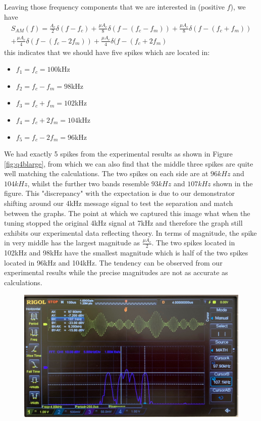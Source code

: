 \documentclass[11pt]{article}
\begin{document}
\begin{enumerate}[label=(\alph*)]
Leaving those frequency components that we are interested in (positive $f$), we have
\begin{align*}
    S_{AM}(f) = \frac{A_c}{2} \delta(f-f_c)+ \frac{\mu A_c}{8}\delta (f-(f_c-f_m)) + \frac{\mu A_c}{8} \delta (f-(f_c+f_m)) \\ +\frac{\mu A_c}{4}\delta (f-(f_c-2f_m)) +\frac{\mu A_c}{4} \delta (f-(f_c+2f_m) 
\end{align*}
this indicates that we should have five spikes which are located in:
\begin{multicols}{3}
\begin{itemize}
    \item $f_1=f_c=100$kHz
    \item $f_2=f_c-f_m=98$kHz
    \item $f_3=f_c+f_m=102$kHz
    \item $f_4=f_c+2f_m=104$kHz
    \item $f_5=f_c-2f_m=96$kHz
\end{itemize}
\end{multicols}
We had exactly 5 spikes from the experimental results as shown in Figure \ref{fig:q4blarge}, from which we can also find that the middle three spikes are quite well matching the calculations. The two spikes on each side are at $96kHz$ and $104kHz$, whilst the further two bands resemble $93kHz$ and $107kHz$ shown in the figure. This "discrepancy" with the expectation is due to our demonstrator shifting around our 4kHz message signal to test the separation and match between the graphs. The point at which we captured this image what when the tuning stopped the original 4kHz signal at 7kHz and therefore the graph still exhibits our experimental data reflecting theory. In terms of magnitude, the spike in very middle has the largest magnitude as $\frac{\mu A_c}{2}$. The two spikes located in 102kHz and 98kHz have the smallest magnitude which is half of the two spikes located in 96kHz and 104kHz. The tendency can be observed from our experimental results while the precise magnitudes are not as accurate as calculations. 
\begin{figure}[H]
    \centering
    \includegraphics[scale = 0.15]{Q4bLmu.jpg}

\end{figure}
\end{enumerate}
\end{document}

